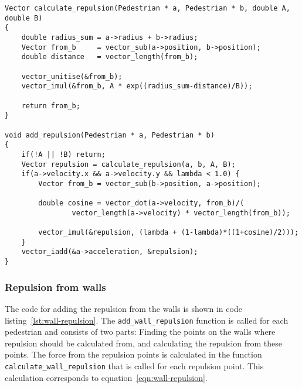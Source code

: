 \begin{lstlisting}[caption={Calculating the repulsion from other 
    pedestrians.},label=lst:pedestrian-repulsion]
Vector calculate_repulsion(Pedestrian * a, Pedestrian * b, double A, double B)
{
    double radius_sum = a->radius + b->radius;
    Vector from_b     = vector_sub(a->position, b->position);
    double distance   = vector_length(from_b);

    vector_unitise(&from_b);
    vector_imul(&from_b, A * exp((radius_sum-distance)/B));

    return from_b;
}

void add_repulsion(Pedestrian * a, Pedestrian * b)
{
    if(!A || !B) return;
    Vector repulsion = calculate_repulsion(a, b, A, B);
	if(a->velocity.x && a->velocity.y && lambda < 1.0) {
		Vector from_b = vector_sub(b->position, a->position);

		double cosine = vector_dot(a->velocity, from_b)/(
				vector_length(a->velocity) * vector_length(from_b));

		vector_imul(&repulsion, (lambda + (1-lambda)*((1+cosine)/2)));
	}
    vector_iadd(&a->acceleration, &repulsion);
}
\end{lstlisting}

\subsubsection{Repulsion from walls}
The code for adding the repulsion from the walls is shown in code 
listing~\ref{lst:wall-repulsion}. The \texttt{add\_wall\_repulsion} function 
is called for each pedestrian and consists of two parts: Finding the points on the 
walls where repulsion should be calculated from, and calculating the repulsion 
from these points. The force from the repulsion points is calculated in the 
function \texttt{calculate\_wall\_repulsion} that is called for each repulsion 
point. This calculation corresponds to equation~\eqref{eqn:wall-repulsion}.



